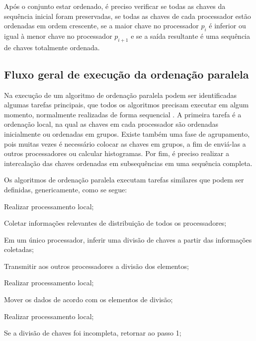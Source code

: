Após o conjunto estar ordenado, é preciso verificar se todas as chaves da sequência inicial foram preservadas, se todas as chaves de cada processador estão ordenadas em ordem crescente, se a maior chave no processador $p_{i}$ é inferior ou igual à menor chave no processador $p_{i+1}$ e se a saída resultante é uma sequência de chaves totalmente ordenada.


\subsection{Fluxo geral de execução da ordenação paralela}

Na execução de um algoritmo de ordenação paralela podem ser identificadas algumas tarefas principais, que todos os algoritmos precisam executar em algum momento, normalmente realizadas de forma sequencial  \cite{Kale:2010}. 
A primeira tarefa é a ordenação local, na qual as chaves em cada processador são ordenadas inicialmente  ou ordenadas em grupos.
Existe também uma fase de agrupamento, pois muitas vezes é necessário colocar as chaves em grupos, a fim de enviá-las a outros processadores ou calcular histogramas. Por fim, é preciso realizar a intercalação das chaves ordenadas em subsequências em uma sequência completa.


Os algoritmos de ordenação paralela executam tarefas similares que podem ser definidas, genericamente, como se segue: 
\begin{num_enum}
\item Realizar processamento local;
\item Coletar informações relevantes de distribuição de todos os processadores;
\item Em um único processador, inferir uma divisão de chaves a partir das informações coletadas;
\item Transmitir aos outros processadores a divisão dos elementos;
\item Realizar processamento local;
\item Mover os dados de acordo com os elementos de divisão;
\item Realizar processamento local;
\item Se a divisão de chaves foi incompleta, retornar ao passo 1;
\end{num_enum}

